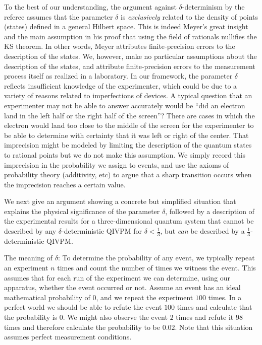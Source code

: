 \documentclass[english,reprint, aps, prl,superscriptaddress, showpacs,
showkeys, longbibliography, amsmath, amssymb, floatfix]{revtex4-1}
\theoremstyle{plain}
\theoremstyle{definition}
\begin{document}
To the best of our understanding, the argument against $\delta$-determinism
by the referee assumes that the parameter $\delta$ is \emph{exclusively}
related to the density of points (states) defined in a general Hilbert
space. This is indeed Meyer's great insight and the main assumption
in his proof that using the field of rationals nullifies the KS theorem.
In other words, Meyer attributes finite-precision errors to the description
of the states. We, however, make no particular assumptions about the
description of the states, and attribute finite-precision errors to
the measurement process itself as realized in a laboratory. In our
framework, the parameter $\delta$ reflects insufficient knowledge
of the experimenter, which could be due to a variety of reasons related
to imperfections of devices. A typical question that an experimenter
may not be able to answer accurately would be ``did an electron land
in the left half or the right half of the screen''? There are cases
in which the electron would land too close to the middle of the screen
for the experimenter to be able to determine with certainty that it
was left or right of the center. That imprecision might be modeled
by limiting the description of the quantum states to rational points
but we do not make this assumption. We simply record this imprecision
in the probability we assign to events, and use the axioms of probability
theory (additivity, etc) to argue that a sharp transition occurs when
the imprecision reaches a certain value. 

We next give an argument showing a concrete but simplified situation
that explains the physical significance of the parameter $\delta$,
followed by a description of the experimental results for a three-dimensional
quantum system that cannot be described by any $\delta$-deterministic
QIVPM for $\delta<\frac{1}{3}$, but \emph{can} be described by a
$\frac{1}{3}$-deterministic QIVPM.

The meaning of $\delta$: To determine the probability of any event,
we typically repeat an experiment $n$ times and count the number
of times we witness the event. This assumes that for each run of the
experiment we can determine, using our apparatus, whether the event
occurred or not. Assume an event has an ideal mathematical probability
of $0$, and we repeat the experiment $100$ times. In a perfect world
we should be able to refute the event $100$ times and calculate that
the probability is $0$. We might also observe the event $2$ times
and refute it $98$ times and therefore calculate the probability
to be $0.02$. Note that this situation assumes perfect measurement
conditions.
\end{document}
